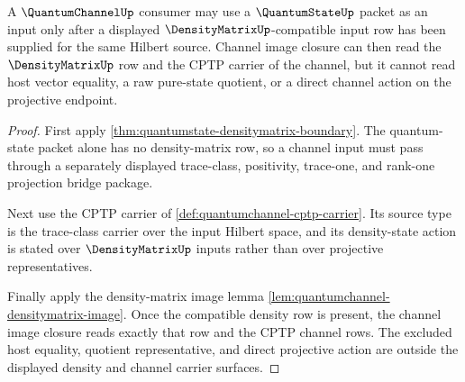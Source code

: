\begin{theorem}
\label{thm:quantumstate-channel-input-boundary}
A $\QuantumChannelUp$ consumer may use a $\QuantumStateUp$ packet as an input
only after a displayed $\DensityMatrixUp$-compatible input row has been supplied
for the same Hilbert source. Channel image closure can then read the
$\DensityMatrixUp$ row and the CPTP carrier of the channel, but it cannot read
host vector equality, a raw pure-state quotient, or a direct channel action on
the projective endpoint.
\end{theorem}
\begin{proof}
First apply \autoref{thm:quantumstate-densitymatrix-boundary}. The
quantum-state packet alone has no density-matrix row, so a channel input must
pass through a separately displayed trace-class, positivity, trace-one, and
rank-one projection bridge package.

Next use the CPTP carrier of \autoref{def:quantumchannel-cptp-carrier}. Its
source type is the trace-class carrier over the input Hilbert space, and its
density-state action is stated over $\DensityMatrixUp$ inputs rather than over
projective representatives.

Finally apply the density-matrix image lemma
\autoref{lem:quantumchannel-densitymatrix-image}. Once the compatible density
row is present, the channel image closure reads exactly that row and the CPTP
channel rows. The excluded host equality, quotient representative, and direct
projective action are outside the displayed density and channel carrier
surfaces.
\end{proof}

